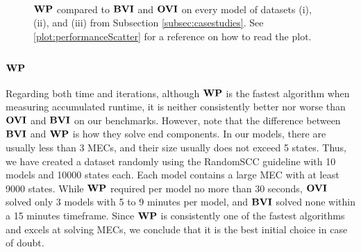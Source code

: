 \begin{figure}[h!]
    \centering
    \
    \caption{$\mathbf{WP}$ compared to $\mathbf{BVI}$ and $\mathbf{OVI}$ on every model of datasets (i), (ii), and (iii) from Subsection \ref{subsec:casestudies}. See \ref{plot:performanceScatter} for a reference on how to read the plot.}%
    \label{fig:WPvsBVIvsOVI}%
    \end{figure}
\FloatBarrier

\subsubsection*{\underline{$\mathbf{WP}$}}
Regarding both time and iterations, although $\mathbf{WP}$ is the fastest algorithm when measuring accumulated runtime, it is neither consistently better nor worse than $\mathbf{OVI}$ and $\mathbf{BVI}$ on our benchmarks.
However, note that the difference between $\mathbf{BVI}$ and $\mathbf{WP}$ is how they solve end components. In our models, there are usually less than 3 MECs, and their size usually does not exceed 5 states.
Thus, we have created a dataset randomly using the RandomSCC guideline with 10 models and 10000 states each. Each model contains a large MEC with at least 9000 states.
While $\mathbf{WP}$ required per model no more than 30 seconds, $\mathbf{OVI}$ solved only 3 models with 5 to 9 minutes per model, and $\mathbf{BVI}$ solved none within a 15 minutes timeframe. 
Since $\mathbf{WP}$ is consistently one of the fastest algorithms and excels at solving MECs, we conclude that it is the best initial choice in case of doubt.

